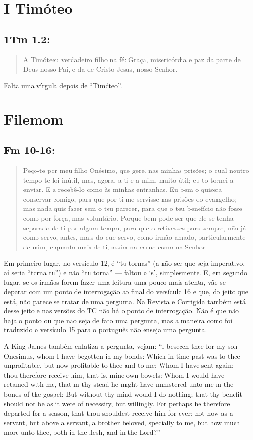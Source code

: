 \section{I Timóteo}
\subsection*{1Tm 1.2:}
\begin{quote}
    \small
A Timóteeu verdadeiro filho na fé: Graça,
misericórdia e paz da parte de Deus nosso Pai, e da de Cristo Jesus, nosso
Senhor.
\end{quote}

Falta uma vírgula depois de ``Timóteo''.

\section{Filemom}
\subsection*{Fm 10-16:}
\begin{quote}
    \small
Peço-te por meu filho Onésimo, que gerei nas minhas prisões; o qual noutro tempo te foi inútil, mas, agora, a ti e a mim, muito útil; eu to tornei a enviar. E  a recebê-lo como às minhas entranhas. Eu bem o quisera conservar comigo, para que por ti me servisse nas prisões do evangelho; mas nada quis fazer sem o teu parecer, para que o teu benefício não fosse como por força, mas voluntário. Porque bem pode ser que ele se tenha separado de ti por algum tempo, para que o retivesses para sempre, não já como servo, antes, mais do que servo, como irmão amado, particularmente de mim, e quanto mais de ti, assim na carne como no Senhor.
\end{quote}

Em primeiro lugar, no versículo 12, é ``tu tornas'' (a não ser que seja imperativo, aí seria ``torna tu'') e não ``tu torna'' --- faltou o `s', simplesmente. E, em segundo lugar, se os irmãos forem fazer uma leitura uma pouco mais atenta, vão se deparar com um ponto de interrogação ao final do versículo 16 e que, do jeito que está, não parece se tratar de uma pergunta. Na Revista e Corrigida também está
desse jeito e nas versões do TC não há o ponto de interrogação. Não é que não haja o ponto ou que não seja de fato uma pergunta, mas a maneira como foi traduzido o versículo 15 para o português não enseja uma pergunta.

A King James também enfatiza a pergunta, vejam: ``I beseech thee for my son Onesimus, whom I have begotten in my bonds: Which in time past was to thee unprofitable, but now profitable to thee and to me: Whom I have sent again: thou therefore receive him, that is, mine own bowels: Whom I would have retained with me, that in thy stead he might have ministered unto me in the bonds of the gospel: But without thy mind would I do nothing; that thy benefit should not be as it were of
necessity, but willingly. For perhaps he therefore departed for a season, that thou shouldest receive him for ever; not now as a servant, but above a servant, a brother beloved, specially to me, but how much more unto thee, both in the flesh, and in the Lord?''

